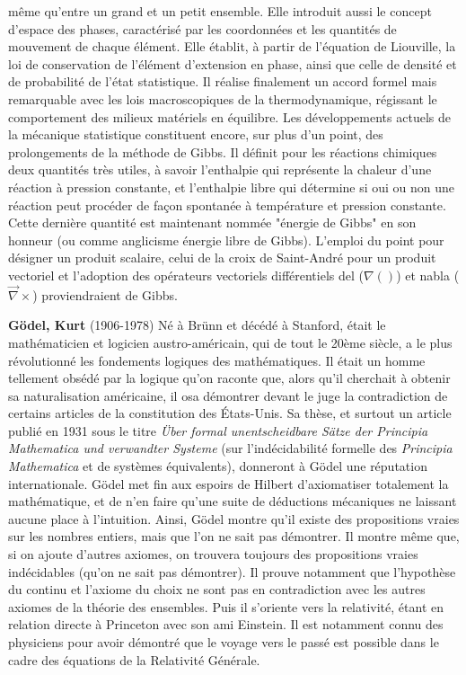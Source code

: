 même qu'entre un grand et un petit ensemble. Elle introduit aussi le concept d'espace des phases, caractérisé par les coordonnées et les quantités de mouvement de chaque élément. Elle établit, à partir de l'équation de Liouville, la loi de conservation de l'élément d'extension en phase, ainsi que celle de densité et de probabilité de l'état statistique. Il réalise finalement un accord formel mais remarquable avec les lois macroscopiques de la thermodynamique, régissant le comportement des milieux matériels en équilibre. Les développements actuels de la mécanique statistique constituent encore, sur plus d'un point, des prolongements de la méthode de Gibbs. Il définit pour les réactions chimiques deux quantités très utiles, à savoir l'enthalpie qui représente la chaleur d'une réaction à pression constante, et l'enthalpie libre qui détermine si oui ou non une réaction peut procéder de façon spontanée à température et pression constante. Cette dernière quantité est maintenant nommée "énergie de Gibbs" en son honneur (ou comme anglicisme énergie libre de Gibbs). L'emploi du point pour désigner un produit scalaire, celui de la croix de Saint-André pour un produit vectoriel et l'adoption des opérateurs vectoriels différentiels del ($\nabla()$) et nabla ($\vec{\nabla}\times$) proviendraient de Gibbs.

\textbf{Gödel, Kurt} (1906-1978) Né à Brünn et décédé à Stanford, était le mathématicien et logicien austro-américain, qui de tout le 20ème siècle, a le plus révolutionné les fondements logiques des mathématiques. Il était un homme tellement obsédé par la logique qu'on raconte que, alors qu'il cherchait à obtenir sa naturalisation américaine, il osa démontrer devant le juge la contradiction de certains articles de la constitution des États-Unis. Sa thèse, et surtout un article publié en 1931 sous le titre \textit{Über formal unentscheidbare Sätze der Principia Mathematica und verwandter Systeme} (sur l'indécidabilité formelle des \textit{Principia Mathematica} et de systèmes équivalents), donneront à Gödel une réputation internationale. Gödel met fin aux espoirs de Hilbert d'axiomatiser totalement la mathématique, et de n'en faire qu'une suite de déductions mécaniques ne laissant aucune place à l'intuition. Ainsi, Gödel montre qu'il existe des propositions vraies sur les nombres entiers, mais que l'on ne sait pas démontrer. Il montre même que, si on ajoute d'autres axiomes, on trouvera toujours des propositions vraies indécidables (qu'on ne sait pas démontrer). Il prouve notamment que l'hypothèse du continu et l'axiome du choix ne sont pas en contradiction avec les autres axiomes de la théorie des ensembles. Puis il s'oriente vers la relativité, étant en relation directe à Princeton avec son ami Einstein. Il est notamment connu des physiciens pour avoir démontré que le voyage vers le passé est possible dans le cadre des équations de la Relativité Générale.

